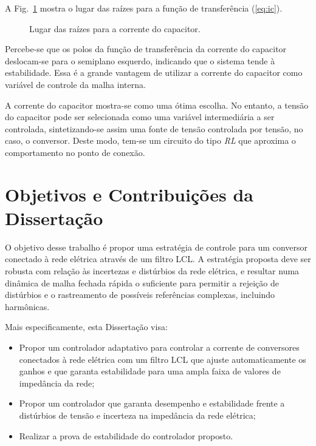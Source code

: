   A Fig.~\ref{fig:rlocus_ic} mostra o lugar das raízes para a função de transferência (\ref{eq:ic}).

  \begin{figure}[htb]
    \centering{
      }
    \renewcommand\figurename{Fig.}
    \caption{Lugar das raízes para a corrente do capacitor.}
    \label{fig:rlocus_ic}
  \end{figure}

  Percebe-se que os polos da função de transferência da corrente do capacitor deslocam-se para o semiplano esquerdo, indicando que o sistema tende à estabilidade. Essa é a grande vantagem de utilizar a corrente do capacitor como variável de controle da malha interna.

  A corrente do capacitor mostra-se como uma ótima escolha. No entanto, a tensão do capacitor pode ser selecionada como uma variável intermediária a ser controlada, sintetizando-se assim uma fonte de tensão controlada por tensão, no caso, o conversor. Deste modo, tem-se um circuito do tipo \emph{RL} que aproxima o comportamento no ponto de conexão.



\section{Objetivos e Contribuições da Dissertação}

	O objetivo desse trabalho é propor uma estratégia de controle para um conversor conectado à rede elétrica através de um filtro LCL. A estratégia proposta deve ser robusta com relação às incertezas e distúrbios da rede elétrica, e resultar numa dinâmica de malha fechada rápida o suficiente para permitir a rejeição de distúrbios e o rastreamento de possíveis referências complexas, incluindo harmônicas.

	Mais especificamente, esta Dissertação visa:

	\begin{itemize}
		\item Propor um controlador adaptativo para controlar a corrente de conversores conectados à rede elétrica com um filtro LCL que ajuste automaticamente os ganhos e que garanta estabilidade para uma ampla faixa de valores de impedância da rede;
		\item Propor um controlador que garanta desempenho e estabilidade frente a distúrbios de tensão e incerteza na impedância da rede elétrica;
		\item Realizar a prova de estabilidade do controlador proposto.
	\end{itemize}


